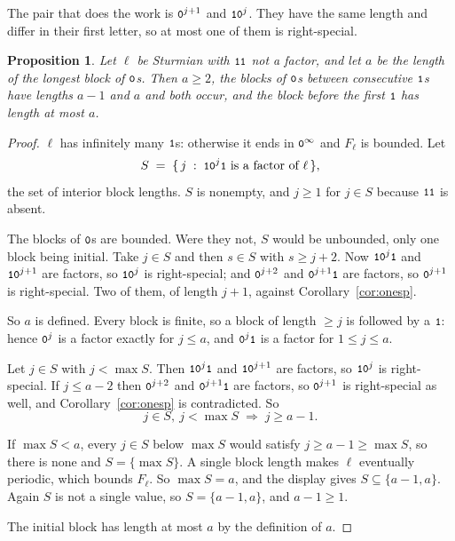 \documentclass[11pt,a4paper]{article}
\newcommand{\seq}[1]{\texttt{\small #1}}
\theoremstyle{definition}
\theoremstyle{plain}
\newtheorem{proposition}[definition]{Proposition}
\begin{document}
The pair that does the work is $\seq{0}^{j+1}$ and $\seq{1}\seq{0}^{j}$. They
have the same length and differ in their first letter, so at most one of them is
right-special.

\begin{proposition}\label{prop:blocks}
Let $\ell$ be Sturmian with $\seq{11}$ not a factor, and let $a$ be the length of
the longest block of $\seq{0}$s. Then $a \geq 2$, the blocks of $\seq{0}$s
between consecutive $\seq{1}$s have lengths $a-1$ and $a$ and both occur, and the
block before the first $\seq{1}$ has length at most $a$.
\end{proposition}

\begin{proof}
$\ell$ has infinitely many $\seq{1}$s: otherwise it ends in $\seq{0}^\infty$ and
$F_\ell$ is bounded. Let
\[
  S \;=\; \{\, j \;:\; \seq{1}\seq{0}^{j}\seq{1} \text{ is a factor of } \ell \,\},
\]
the set of interior block lengths. $S$ is nonempty, and $j \geq 1$ for $j \in S$
because $\seq{11}$ is absent.

The blocks of $\seq{0}$s are bounded. Were they not, $S$ would be unbounded,
only one block being initial. Take $j \in S$ and then $s \in S$ with
$s \geq j+2$. Now $\seq{1}\seq{0}^{j}\seq{1}$ and $\seq{1}\seq{0}^{j+1}$ are
factors, so $\seq{1}\seq{0}^{j}$ is right-special; and $\seq{0}^{j+2}$ and
$\seq{0}^{j+1}\seq{1}$ are factors, so $\seq{0}^{j+1}$ is right-special. Two of
them, of length $j+1$, against Corollary~\ref{cor:onesp}.

So $a$ is defined. Every block is finite, so a block of length $\geq j$ is
followed by a $\seq{1}$: hence $\seq{0}^{j}$ is a factor exactly for
$j \leq a$, and $\seq{0}^{j}\seq{1}$ is a factor for $1 \leq j \leq a$.

Let $j \in S$ with $j < \max S$. Then $\seq{1}\seq{0}^{j}\seq{1}$ and
$\seq{1}\seq{0}^{j+1}$ are factors, so $\seq{1}\seq{0}^{j}$ is right-special. If
$j \leq a-2$ then $\seq{0}^{j+2}$ and $\seq{0}^{j+1}\seq{1}$ are factors, so
$\seq{0}^{j+1}$ is right-special as well, and Corollary~\ref{cor:onesp} is
contradicted. So
\[
  j \in S,\ j < \max S \;\Longrightarrow\; j \geq a-1 .
\]

If $\max S < a$, every $j \in S$ below $\max S$ would satisfy
$j \geq a-1 \geq \max S$, so there is none and $S = \{\max S\}$. A single block
length makes $\ell$ eventually periodic, which bounds $F_\ell$. So $\max S = a$,
and the display gives $S \subseteq \{a-1,a\}$. Again $S$ is not a single value,
so $S = \{a-1,a\}$, and $a-1 \geq 1$.

The initial block has length at most $a$ by the definition of $a$.
\end{proof}
\end{document}
